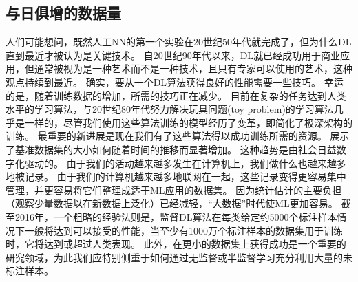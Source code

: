 \subsection{与日俱增的数据量}
\label{sec:increasing_dataset_sizes}
人们可能想问，既然人工\gls{NN}的第一个实验在20世纪50年代就完成了，但为什么\gls{DL}直到最近才被认为是关键技术。
自20世纪90年代以来，\gls{DL}就已经成功用于商业应用，但通常被视为是一种艺术而不是一种技术，且只有专家可以使用的艺术，这种观点持续到最近。
确实，要从一个\gls{DL}算法获得良好的性能需要一些技巧。
幸运的是，随着训练数据的增加，所需的技巧正在减少。
目前在复杂的任务达到人类水平的学习算法，与20世纪80年代努力解决玩具问题(toy problem)的学习算法几乎是一样的，尽管我们使用这些算法训练的模型经历了变革，即简化了极深架构的训练。
最重要的新进展是现在我们有了这些算法得以成功训练所需的资源。
展示了基准数据集的大小如何随着时间的推移而显著增加。
这种趋势是由社会日益数字化驱动的。
由于我们的活动越来越多发生在计算机上，我们做什么也越来越多地被记录。
由于我们的计算机越来越多地联网在一起，这些记录变得更容易集中管理，并更容易将它们整理成适于\gls{ML}应用的数据集。
因为统计估计的主要负担（观察少量数据以在新数据上泛化）已经减轻，``大数据''时代使\gls{ML}更加容易。
截至2016年，一个粗略的经验法则是，监督\gls{DL}算法在每类给定约5000个标注样本情况下一般将达到可以接受的性能，当至少有1000万个标注样本的数据集用于训练时，它将达到或超过人类表现。
此外，在更小的数据集上获得成功是一个重要的研究领域，为此我们应特别侧重于如何通过无监督或半监督学习充分利用大量的未标注样本。

